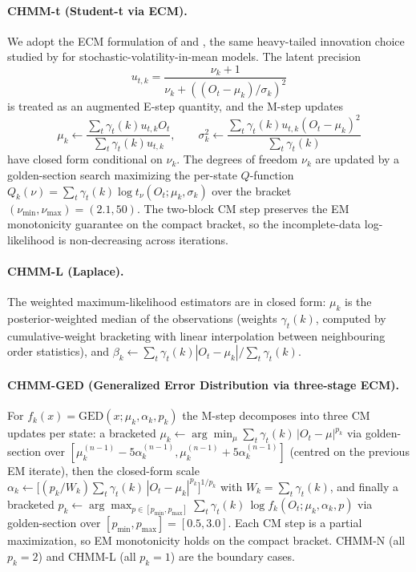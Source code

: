 \paragraph{CHMM-t (Student-t via ECM).}
We adopt the ECM formulation of \citet{peel2000robust} and \citet{liu1995ml}, the same heavy-tailed innovation choice studied by \citet{abantovalle2017svm} for stochastic-volatility-in-mean models.
The latent precision
\begin{equation}
    u_{t,k} = \frac{\nu_k + 1}{\nu_k + ((O_t - \mu_k)/\sigma_k)^2}
    \label{eq:tprecision}
\end{equation}
is treated as an augmented E-step quantity, and the M-step updates
\begin{equation}
    \mu_k \leftarrow \frac{\sum_t \gamma_t(k) u_{t,k} O_t}{\sum_t \gamma_t(k) u_{t,k}},
    \qquad
    \sigma_k^2 \leftarrow \frac{\sum_t \gamma_t(k) u_{t,k} (O_t - \mu_k)^2}{\sum_t \gamma_t(k)}
    \label{eq:tupdate}
\end{equation}
have closed form conditional on $\nu_k$.
The degrees of freedom $\nu_k$ are updated by a golden-section search
maximizing the per-state $Q$-function
$Q_k(\nu) = \sum_t \gamma_t(k) \log t_\nu(O_t; \mu_k, \sigma_k)$
over the bracket $(\nu_{\min}, \nu_{\max}) = (2.1, 50)$.
The two-block CM step preserves the EM monotonicity guarantee on the compact bracket, so the incomplete-data log-likelihood is non-decreasing across iterations.

\paragraph{CHMM-L (Laplace).}
The weighted maximum-likelihood estimators are in closed form: $\mu_k$ is the posterior-weighted median of the observations (weights $\gamma_t(k)$, computed by cumulative-weight bracketing with linear interpolation between neighbouring order statistics), and $\beta_k \leftarrow \sum_t \gamma_t(k) |O_t - \mu_k| / \sum_t \gamma_t(k)$.

\paragraph{CHMM-GED (Generalized Error Distribution via three-stage ECM).}
For $f_k(x) = \mathrm{GED}(x; \mu_k, \alpha_k, p_k)$ the M-step decomposes into three CM updates per state: a bracketed $\mu_k \leftarrow \arg\min_{\mu} \sum_t \gamma_t(k)\,|O_t - \mu|^{p_k}$ via golden-section over $[\mu_k^{(n-1)} - 5\alpha_k^{(n-1)}, \mu_k^{(n-1)} + 5\alpha_k^{(n-1)}]$ (centred on the previous EM iterate), then the closed-form scale $\alpha_k \leftarrow \big[(p_k / W_k) \sum_t \gamma_t(k)\,|O_t - \mu_k|^{p_k}\big]^{1/p_k}$ with $W_k = \sum_t \gamma_t(k)$, and finally a bracketed $p_k \leftarrow \arg\max_{p \in [p_{\min}, p_{\max}]} \sum_t \gamma_t(k)\, \log f_k(O_t; \mu_k, \alpha_k, p)$ via golden-section over $[p_{\min}, p_{\max}] = [0.5, 3.0]$. Each CM step is a partial maximization, so EM monotonicity holds on the compact bracket. CHMM-N (all $p_k = 2$) and CHMM-L (all $p_k = 1$) are the boundary cases.
